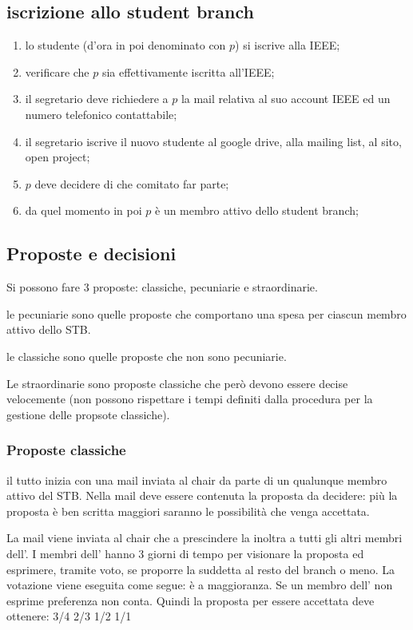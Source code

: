 \subsection{iscrizione allo student branch}

\begin{enumerate}
	\item lo studente (d'ora in poi denominato con $p$) si iscrive alla IEEE;
	\item verificare che $p$ sia effettivamente iscritta all’IEEE;
	\item il segretario deve richiedere a $p$ la mail relativa al suo account IEEE ed un numero telefonico contattabile;
	\item il segretario iscrive il nuovo studente al google drive, alla mailing list, al sito, open project;
	\item $p$ deve decidere di che comitato far parte;
	\item da quel momento in poi $p$ è un membro attivo dello student branch;
\end{enumerate}

\subsection{Proposte e decisioni}

Si possono fare 3 proposte: classiche, pecuniarie e straordinarie.

le pecuniarie sono quelle proposte che comportano una spesa per ciascun membro attivo dello STB.

le classiche sono quelle proposte che non sono pecuniarie.

Le straordinarie sono proposte classiche che però devono essere decise velocemente (non possono rispettare i tempi definiti dalla procedura per la gestione delle propsote classiche).

\subsubsection{Proposte classiche}

il tutto inizia con una mail inviata al chair da parte di un qualunque membro attivo del STB. Nella mail deve essere contenuta la proposta da decidere: più la proposta è ben scritta maggiori saranno le possibilità che venga accettata. 

La mail viene inviata al chair che a prescindere la inoltra a tutti gli altri membri dell'\EC{}. I membri dell'\EC{} hanno 3 giorni di tempo per visionare la proposta ed esprimere, tramite voto, se proporre la suddetta al resto del branch o meno.
La votazione viene eseguita come segue:
è a maggioranza. Se un membro dell'\EC{} non esprime preferenza non conta. Quindi la proposta per essere accettata deve ottenere:
3/4
2/3
1/2
1/1


